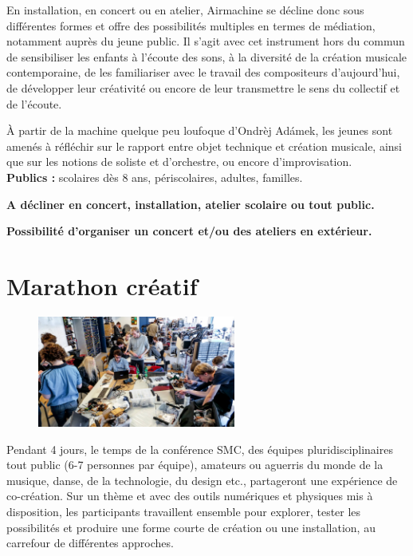 \documentclass[fontsize=12pt]{scrartcl} %
\numberwithin{equation}{section} %
\numberwithin{table}{section} %
\begin{document}
En installation, en concert ou en atelier, Airmachine se décline donc sous différentes formes et offre des possibilités multiples en termes de médiation, notamment auprès du jeune public. Il s'agit avec cet instrument hors du commun de sensibiliser les enfants à l'écoute des sons, à la diversité de la création musicale contemporaine, de les familiariser avec le travail des compositeurs d'aujourd'hui, de développer leur créativité ou encore de leur transmettre le sens du collectif et de l'écoute.

À partir de la machine quelque peu loufoque d'Ondrèj Adámek, les jeunes sont amenés à réfléchir sur le rapport entre objet technique et création musicale, ainsi que sur les notions de soliste et d'orchestre, ou encore d'improvisation.\\

\noindent
\textbf{Publics :} scolaires dès 8 ans, périscolaires, adultes, familles.

\noindent
\textbf{A décliner en concert, installation, atelier scolaire ou tout public.}

\noindent
\textbf{Possibilité d'organiser un concert et/ou des ateliers en extérieur.}

\pagebreak

\section{Marathon créatif}
\label{app:marathon}

\begin{figure}
\centering
\includegraphics[width=6.5cm]{img/marathon}
\label{fig:marathon}
\end{figure}

Pendant 4 jours, le temps de la conférence SMC, des équipes pluridisciplinaires tout public (6-7 personnes par équipe), amateurs ou aguerris du monde de la musique, danse, de la technologie, du design etc., partageront une expérience de co-création. Sur un thème et avec des outils numériques et physiques mis à disposition, les participants travaillent ensemble pour explorer, tester les possibilités et produire une forme courte de création ou une installation, au carrefour de différentes approches.
\end{document}
